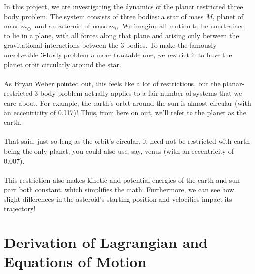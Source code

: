 \documentclass[11pt]{article}
\begin{document}
In this project, we are investigating the dynamics of the planar restricted three body problem. The system consists of three bodies: a star of mass $M$, planet of mass $m_\oplus$, and an asteroid of mass $m_{0}$. We imagine all motion to be constrained to lie in a plane, with all forces along that plane and arising only between the gravitational interactions between the 3 bodies. To make the famously unsolveable 3-body problem a more tractable one, we restrict it to have the planet orbit circularly around the star. 
\\
\\
\noindent
As \href{https://orbital-mechanics.space/the-n-body-problem/circular-restricted-three-body-problem.html}{Bryan Weber} pointed out, this feels like a lot of restrictions, but the planar-restricted 3-body problem actually applies to a fair number of systems that we care about. For example, the earth's orbit around the sun is almost circular (with an eccentricity of 0.017)! Thus, from here on out, we'll refer to the planet as the earth. 
\\
\\
\noindent
That said, just so long as the orbit's circular, it need not be restricted with earth being the only planet; you could also use, say, venus (with an eccentricity of \href{https://nssdc.gsfc.nasa.gov/planetary/factsheet/venusfact.html}{0.007}).
\\
\\
\noindent
This restriction also makes kinetic and potential energies of the earth and sun part both constant, which simplifies the math.
Furthermore, we can see how slight differences in the asteroid's starting position and velocities impact its trajectory! 

\section{Derivation of Lagrangian and Equations of Motion}
\end{document}
